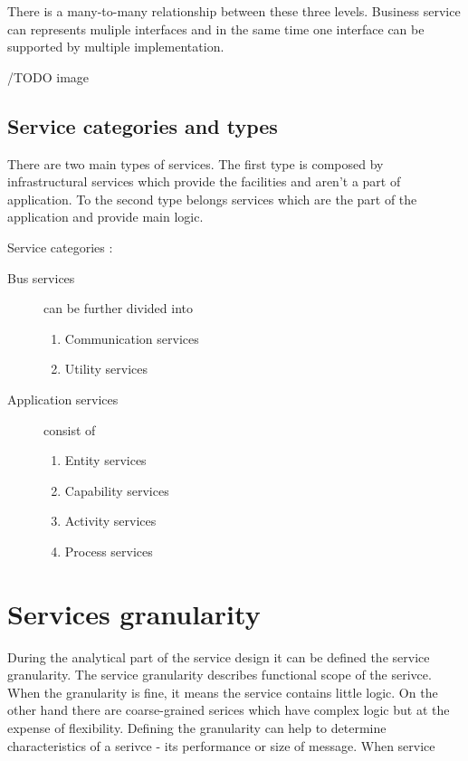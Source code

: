 There is a many-to-many relationship between these three levels. Business service can represents muliple interfaces and in the same time one interface can be supported by multiple implementation.

/TODO image

\subsection{Service categories and types} 

There are two main types of services. The first type is composed by infrastructural services which provide the facilities and aren't a part of application. To the second type belongs services which are the part of the application and provide main logic.

\bigskip

Service categories \cite{website:ontology-taxonomy} :
\begin{description}
  \item[Bus services] can be further divided into 
  \begin{enumerate}
    \item Communication services 
    \item Utility services
  \end{enumerate}
  \item[Application services] consist of   
  \begin{enumerate}
    \item Entity services
    \item Capability services
    \item Activity services
    \item Process services
  \end{enumerate}
\end{description}


\section{Services granularity}
\label{sec:granularity}
During the analytical part of the service design it can be defined the service granularity. The service granularity describes functional scope of the serivce. When the granularity is fine, it means the service contains little logic. On the other hand there are coarse-grained serices which have complex logic but at the expense of flexibility.
Defining the granularity can help to determine characteristics of a serivce - its performance or size of message. \cite{soa-contract} When service 

